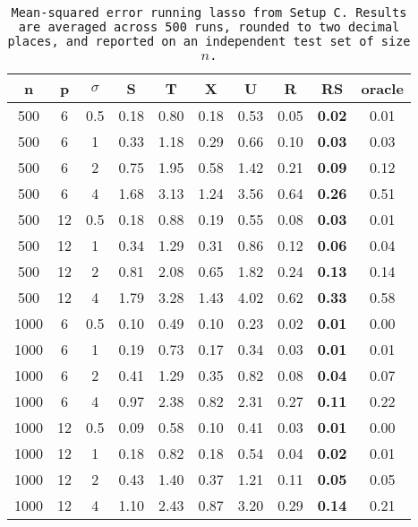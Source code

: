 \begin{table}[ht]
\centering
\begin{tabular}{cccccccccc}
  \hline
n & p & $\sigma$ & S & T & X & U & R & RS & oracle \\ 
  \hline
500 & 6 & 0.5 & 0.18 & 0.80 & 0.18 & 0.53 & 0.05 & \bf 0.02 & 0.01 \\ 
  500 & 6 & 1 & 0.33 & 1.18 & 0.29 & 0.66 & 0.10 & \bf 0.03 & 0.03 \\ 
  500 & 6 & 2 & 0.75 & 1.95 & 0.58 & 1.42 & 0.21 & \bf 0.09 & 0.12 \\ 
  500 & 6 & 4 & 1.68 & 3.13 & 1.24 & 3.56 & 0.64 & \bf 0.26 & 0.51 \\ 
  500 & 12 & 0.5 & 0.18 & 0.88 & 0.19 & 0.55 & 0.08 & \bf 0.03 & 0.01 \\ 
  500 & 12 & 1 & 0.34 & 1.29 & 0.31 & 0.86 & 0.12 & \bf 0.06 & 0.04 \\ 
  500 & 12 & 2 & 0.81 & 2.08 & 0.65 & 1.82 & 0.24 & \bf 0.13 & 0.14 \\ 
  500 & 12 & 4 & 1.79 & 3.28 & 1.43 & 4.02 & 0.62 & \bf 0.33 & 0.58 \\ 
  1000 & 6 & 0.5 & 0.10 & 0.49 & 0.10 & 0.23 & 0.02 & \bf 0.01 & 0.00 \\ 
  1000 & 6 & 1 & 0.19 & 0.73 & 0.17 & 0.34 & 0.03 & \bf 0.01 & 0.01 \\ 
  1000 & 6 & 2 & 0.41 & 1.29 & 0.35 & 0.82 & 0.08 & \bf 0.04 & 0.07 \\ 
  1000 & 6 & 4 & 0.97 & 2.38 & 0.82 & 2.31 & 0.27 & \bf 0.11 & 0.22 \\ 
  1000 & 12 & 0.5 & 0.09 & 0.58 & 0.10 & 0.41 & 0.03 & \bf 0.01 & 0.00 \\ 
  1000 & 12 & 1 & 0.18 & 0.82 & 0.18 & 0.54 & 0.04 & \bf 0.02 & 0.01 \\ 
  1000 & 12 & 2 & 0.43 & 1.40 & 0.37 & 1.21 & 0.11 & \bf 0.05 & 0.05 \\ 
  1000 & 12 & 4 & 1.10 & 2.43 & 0.87 & 3.20 & 0.29 & \bf 0.14 & 0.21 \\ 
   \hline
\end{tabular}
\caption{\tt Mean-squared error running \texttt{lasso} from Setup C. Results are averaged across 500 runs, rounded to two decimal places, and reported on an independent test set of size $n$.} 
\label{table:setup3}
\end{table}
